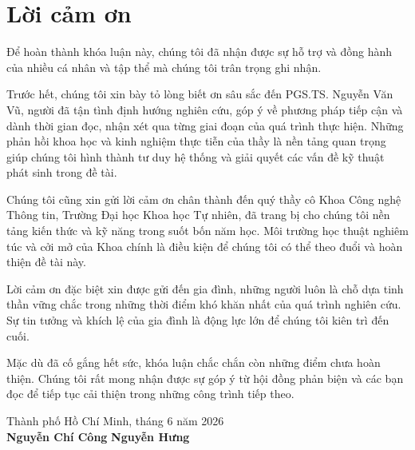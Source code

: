 \chapter*{Lời cảm ơn}
\label{appendix:thanks}

Để hoàn thành khóa luận này, chúng tôi đã nhận được sự hỗ trợ và đồng hành của nhiều cá nhân và tập thể mà chúng tôi trân trọng ghi nhận.

Trước hết, chúng tôi xin bày tỏ lòng biết ơn sâu sắc đến PGS.TS. Nguyễn Văn Vũ, người đã tận tình định hướng nghiên cứu, góp ý về phương pháp tiếp cận và dành thời gian đọc, nhận xét qua từng giai đoạn của quá trình thực hiện. Những phản hồi khoa học và kinh nghiệm thực tiễn của thầy là nền tảng quan trọng giúp chúng tôi hình thành tư duy hệ thống và giải quyết các vấn đề kỹ thuật phát sinh trong đề tài.

Chúng tôi cũng xin gửi lời cảm ơn chân thành đến quý thầy cô Khoa Công nghệ Thông tin, Trường Đại học Khoa học Tự nhiên, đã trang bị cho chúng tôi nền tảng kiến thức và kỹ năng trong suốt bốn năm học. Môi trường học thuật nghiêm túc và cởi mở của Khoa chính là điều kiện để chúng tôi có thể theo đuổi và hoàn thiện đề tài này.

Lời cảm ơn đặc biệt xin được gửi đến gia đình, những người luôn là chỗ dựa tinh thần vững chắc trong những thời điểm khó khăn nhất của quá trình nghiên cứu. Sự tin tưởng và khích lệ của gia đình là động lực lớn để chúng tôi kiên trì đến cuối.

Mặc dù đã cố gắng hết sức, khóa luận chắc chắn còn những điểm chưa hoàn thiện. Chúng tôi rất mong nhận được sự góp ý từ hội đồng phản biện và các bạn đọc để tiếp tục cải thiện trong những công trình tiếp theo.

\vspace{2cm}

\begin{flushright}
Thành phố Hồ Chí Minh, tháng 6 năm 2026 \\[0.5cm]
\textbf{Nguyễn Chí Công} \hspace{2cm} \textbf{Nguyễn Hưng}
\end{flushright}
